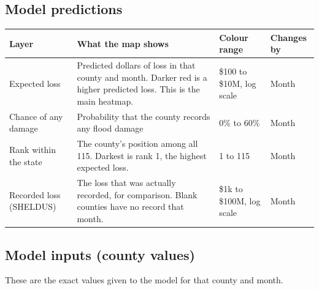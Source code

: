 \documentclass[11pt]{article}
\begin{document}
\subsection{Model predictions}

\begin{table}[H]
\centering
\small
\begin{tabularx}{\textwidth}{lYll}
\toprule
\textbf{Layer} & \textbf{What the map shows} & \textbf{Colour range} & \textbf{Changes by} \\
\midrule
Expected loss & Predicted dollars of loss in that county and month. Darker red is a higher predicted loss. This is the main heatmap. & \$100 to \$10M, log scale & Month \\
Chance of any damage & Probability that the county records any flood damage & 0\% to 60\% & Month \\
Rank within the state & The county's position among all 115. Darkest is rank 1, the highest expected loss. & 1 to 115 & Month \\
Recorded loss (SHELDUS) & The loss that was actually recorded, for comparison. Blank counties have no record that month. & \$1k to \$100M, log scale & Month \\
\bottomrule
\end{tabularx}
\end{table}

\subsection{Model inputs (county values)}

These are the exact values given to the model for that county and month.
\end{document}
